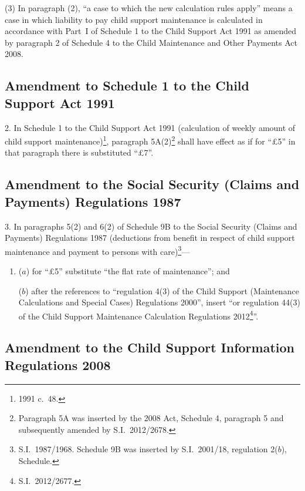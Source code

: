 \documentclass[12pt,a4paper]{article}
\begin{document}
(3) In paragraph (2), “a case to which the new calculation rules apply” means a case in which liability to pay child support maintenance is calculated in accordance with Part~I of Schedule 1 to the Child Support Act 1991 as amended by paragraph 2 of Schedule 4 to the Child Maintenance and Other Payments Act 2008.

\subsection[2. Amendment to Schedule 1 to the Child Support Act 1991]{Amendment to Schedule 1 to the Child Support Act 1991}

2.  In Schedule 1 to the Child Support Act 1991 (calculation of weekly amount of child support maintenance)\footnote{1991 c.~48.}, paragraph 5A(2)\footnote{Paragraph 5A was inserted by the 2008 Act, Schedule 4, paragraph 5 and subsequently amended by S.I.~2012/2678.} shall have effect as if for “£5” in that paragraph there is substituted “£7”.

\subsection[3. Amendment to the Social Security (Claims and Payments) Regulations 1987]{Amendment to the Social Security (Claims and Payments) Regulations 1987}

3.  In paragraphs 5(2) and 6(2) of Schedule 9B to the Social Security (Claims and Payments) Regulations 1987 (deductions from benefit in respect of child support maintenance and payment to persons with care)\footnote{S.I.~1987/1968. Schedule 9B was inserted by S.I.~2001/18, regulation 2($b$), Schedule.}—
\begin{enumerate}\item[]
($a$) for “£5” substitute “the flat rate of maintenance”; and

($b$) after the references to “regulation 4(3) of the Child Support (Maintenance Calculations and Special Cases) Regulations 2000”, insert “or regulation 44(3) of the Child Support Maintenance Calculation Regulations 2012\footnote{S.I.~2012/2677.}”.
\end{enumerate}

\subsection[4. Amendment to the Child Support Information Regulations 2008]{Amendment to the Child Support Information Regulations 2008}
\end{document}
